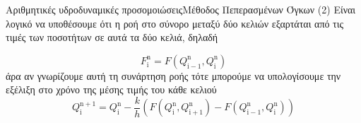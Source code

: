 \documentclass{beamer}
\begin{document}
\begin{frame}{Αριθμητικές υδροδυναμικές προσομοιώσεις}{Μέθοδος Πεπερασμένων Όγκων (2)}
	Είναι λογικό να υποθέσουμε ότι η ροή στο σύνορο μεταξύ δύο κελιών εξαρτάται από τις τιμές των ποσοτήτων σε αυτά τα δύο κελιά, δηλαδή
	
	\begin{equation}
	F_{\mathrm{i}}^\mathrm{n} = F\left( Q_{\mathrm{i-1}}^\mathrm{n} ,Q_{\mathrm{i}}^\mathrm{n} \right) 
	\end{equation}
	άρα αν γνωρίζουμε αυτή τη συνάρτηση ροής τότε μπορούμε να υπολογίσουμε την εξέλιξη στο χρόνο της μέσης τιμής του κάθε κελιού
	\begin{equation}
	Q_{\mathrm{i}}^\mathrm{n+1} = Q_{\mathrm{i}}^\mathrm{n} - \frac{k}{h}\left(
	F\left( Q_{\mathrm{i}}^\mathrm{n} ,Q_{\mathrm{i+1}}^\mathrm{n} \right)-
	F\left( Q_{\mathrm{i-1}}^\mathrm{n} ,Q_{\mathrm{i}}^\mathrm{n} \right)
	\right) 
	\end{equation} 
\end{frame}
\end{document}
